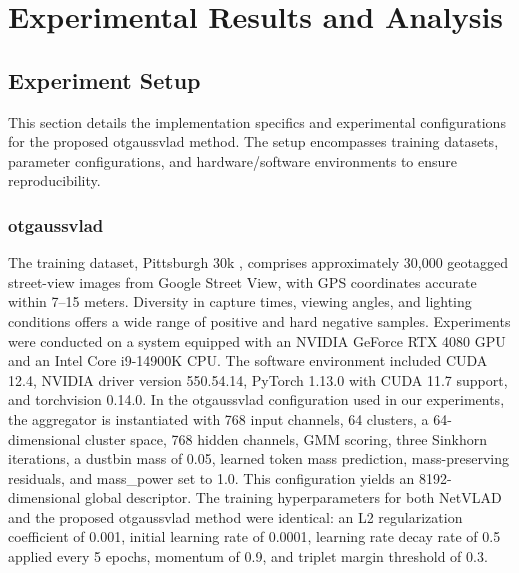 \documentclass[journal]{IEEEtran}
\begin{document}
\section{Experimental Results and Analysis}
\subsection{Experiment Setup}
This section details the implementation specifics and experimental configurations for the proposed otgaussvlad method. The setup encompasses training datasets, parameter configurations, and hardware/software environments to ensure reproducibility.
\subsubsection{otgaussvlad}
The training dataset, Pittsburgh 30k \cite{ref7}, comprises approximately 30,000 geotagged street-view images from Google Street View, with GPS coordinates accurate within 7--15 meters. Diversity in capture times, viewing angles, and lighting conditions offers a wide range of positive and hard negative samples. Experiments were conducted on a system equipped with an NVIDIA GeForce RTX 4080 GPU and an Intel Core i9-14900K CPU. The software environment included CUDA 12.4, NVIDIA driver version 550.54.14, PyTorch 1.13.0 with CUDA 11.7 support, and torchvision 0.14.0. In the otgaussvlad configuration used in our experiments, the aggregator is instantiated with 768 input channels, 64 clusters, a 64-dimensional cluster space, 768 hidden channels, GMM scoring, three Sinkhorn iterations, a dustbin mass of 0.05, learned token mass prediction, mass-preserving residuals, and mass\_power set to 1.0. This configuration yields an 8192-dimensional global descriptor. The training hyperparameters for both NetVLAD and the proposed otgaussvlad method were identical: an L2 regularization coefficient of 0.001, initial learning rate of 0.0001, learning rate decay rate of 0.5 applied every 5 epochs, momentum of 0.9, and triplet margin threshold of 0.3.
\end{document}
